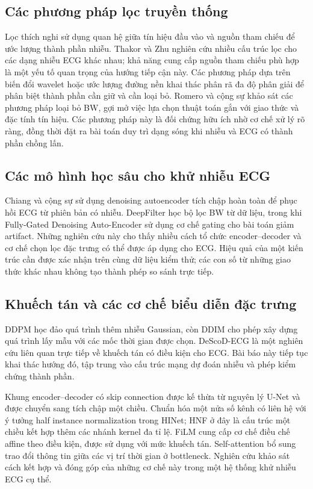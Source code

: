 \documentclass[conference]{IEEEtran}
\begin{document}
\subsection{Các phương pháp lọc truyền thống}
Lọc thích nghi sử dụng quan hệ giữa tín hiệu đầu vào và nguồn tham chiếu để ước lượng thành phần nhiễu. Thakor và Zhu\cite{thakor1991} nghiên cứu nhiều cấu trúc lọc cho các dạng nhiễu ECG khác nhau; khả năng cung cấp nguồn tham chiếu phù hợp là một yếu tố quan trọng của hướng tiếp cận này. Các phương pháp dựa trên biến đổi wavelet hoặc ước lượng đường nền khai thác phân rã đa độ phân giải để phân biệt thành phần cần giữ và cần loại bỏ. Romero và cộng sự\cite{bwcomparison} khảo sát các phương pháp loại bỏ BW, gợi mở việc lựa chọn thuật toán gắn với giao thức và đặc tính tín hiệu. Các phương pháp này là đối chứng hữu ích nhờ cơ chế xử lý rõ ràng, đồng thời đặt ra bài toán duy trì dạng sóng khi nhiễu và ECG có thành phần chồng lấn.

\subsection{Các mô hình học sâu cho khử nhiễu ECG}
Chiang và cộng sự\cite{chiang2019} sử dụng denoising autoencoder tích chập hoàn toàn để phục hồi ECG từ phiên bản có nhiễu. DeepFilter\cite{deepfilter} học bộ lọc BW từ dữ liệu, trong khi Fully-Gated Denoising Auto-Encoder\cite{fgdae} sử dụng cơ chế gating cho bài toán giảm artifact. Những nghiên cứu này cho thấy nhiều cách tổ chức encoder--decoder và cơ chế chọn lọc đặc trưng có thể được áp dụng cho ECG. Hiệu quả của một kiến trúc cần được xác nhận trên cùng dữ liệu kiểm thử; các con số từ những giao thức khác nhau không tạo thành phép so sánh trực tiếp.

\subsection{Khuếch tán và các cơ chế biểu diễn đặc trưng}
DDPM\cite{ddpm} học đảo quá trình thêm nhiễu Gaussian, còn DDIM\cite{ddim} cho phép xây dựng quá trình lấy mẫu với các mốc thời gian được chọn. DeScoD-ECG\cite{descod} là một nghiên cứu liên quan trực tiếp về khuếch tán có điều kiện cho ECG. Bài báo này tiếp tục khai thác hướng đó, tập trung vào cấu trúc mạng dự đoán nhiễu và phép kiểm chứng thành phần.

Khung encoder--decoder có skip connection được kế thừa từ nguyên lý U-Net\cite{unet} và được chuyển sang tích chập một chiều. Chuẩn hóa một nửa số kênh có liên hệ với ý tưởng half instance normalization trong HINet\cite{hinet}; HNF ở đây là cấu trúc một chiều kết hợp thêm các nhánh kernel đa tỉ lệ. FiLM\cite{film} cung cấp cơ chế điều chế affine theo điều kiện, được sử dụng với mức khuếch tán. Self-attention\cite{attention} bổ sung trao đổi thông tin giữa các vị trí thời gian ở bottleneck. Nghiên cứu khảo sát cách kết hợp và đóng góp của những cơ chế này trong một hệ thống khử nhiễu ECG cụ thể.
\end{document}
